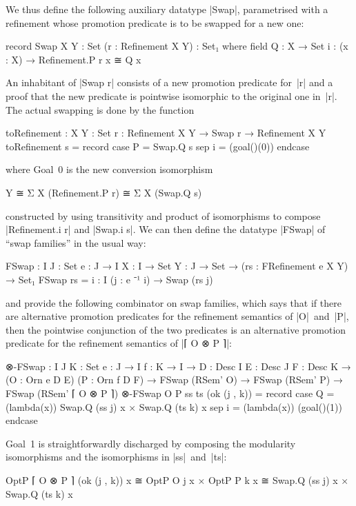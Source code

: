 We thus define the following auxiliary datatype |Swap|, parametrised with a refinement whose promotion predicate is to be swapped for a new one:
\begin{code}
record Swap {X Y : Set} (r : Refinement X Y) : Set₁ where
  field
    Q  : X → Set
    i  : (x : X) → Refinement.P r x ≅ Q x
\end{code}
An inhabitant of |Swap r| consists of a new promotion predicate for~|r| and a proof that the new predicate is pointwise isomorphic to the original one in~|r|.
The actual swapping is done by the function
\begin{code}
toRefinement : {X Y : Set} {r : Refinement X Y} → Swap r → Refinement X Y
toRefinement s = record  case  P  = Swap.Q s
                         sep   i  = (goal()(0)) endcase
\end{code}
where Goal~0 is the new conversion isomorphism
\begin{code}
Y ≅ Σ X (Refinement.P r) ≅ Σ X (Swap.Q s)
\end{code}
constructed by using transitivity and product of isomorphisms to compose |Refinement.i r| and |Swap.i s|.
We can then define the datatype |FSwap| of ``swap families'' in the usual way:
\begin{code}
FSwap :  {I J : Set} {e : J → I} {X : I → Set} {Y : J → Set} →
         (rs : FRefinement e X Y) → Set₁
FSwap rs = {i : I} (j : e ⁻¹ i) → Swap (rs j)
\end{code}
and provide the following combinator on swap families, which says that if there are alternative promotion predicates for the refinement semantics of |O|~and~|P|, then the pointwise conjunction of the two predicates is an alternative promotion predicate for the refinement semantics of |⌈ O ⊗ P ⌉|:
\begin{code}
⊗-FSwap :  {I J K : Set} {e : J → I} {f : K → I} →
           {D : Desc I} {E : Desc J} {F : Desc K} →
           (O : Orn e D E) (P : Orn f D F) →
           FSwap (RSem' O) → FSwap (RSem' P) → FSwap (RSem' ⌈ O ⊗ P ⌉)
⊗-FSwap O P ss ts (ok (j , k)) =
  record  case  Q  = (lambda(x)) Swap.Q (ss j) x × Swap.Q (ts k) x
          sep   i  = (lambda(x)) (goal()(1)) endcase
\end{code}
Goal~1 is straightforwardly discharged by composing the modularity isomorphisms and the isomorphisms in |ss|~and~|ts|:
\begin{code}
OptP ⌈ O ⊗ P ⌉ (ok (j , k)) x  ≅ OptP O j x       × OptP P k x
                               ≅ Swap.Q (ss j) x  × Swap.Q (ts k) x
\end{code}

